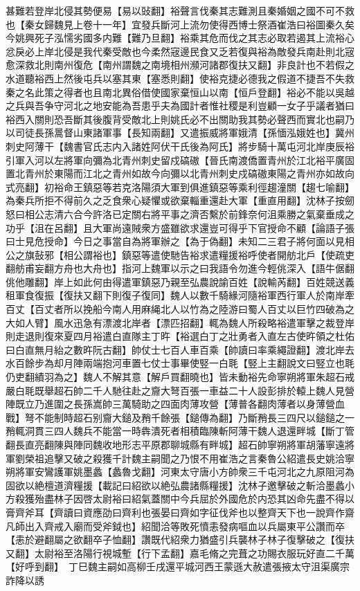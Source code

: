 甚難若登岸北侵其勢便易【易以䜴翻】裕聲言伐秦其志難測且秦婚姻之國不可不救也【秦女歸魏見上卷十一年】宜發兵斷河上流勿使得西博士祭酒崔浩曰裕圖秦久矣今姚興死子泓懦劣國多内難【難乃旦翻】裕乘其危而伐之其志必取若遏其上流裕心忿戾必上岸北侵是我代秦受敵也今柔然宼邊民食又乏若復與裕為敵發兵南赴則北宼愈深救北則南州復危【南州謂魏之南境相州瀕河諸郡復扶又翻】非良計也不若假之水道聽裕西上然後屯兵以塞其東【塞悉則翻】使裕克捷必德我之假道不捷吾不失救秦之名此策之得者也且南北異俗借使國家棄恒山以南【恒戶登翻】裕必不能以吳越之兵與吾争守河北之地安能為吾患乎夫為國計者惟社稷是利豈顧一女子乎議者猶曰裕西入關則恐吾斷其後腹背受敵北上則姚氏必不出關助我其勢必聲西而實北也嗣乃以司徒長孫暠督山東諸軍事【長知兩翻】又遣振威將軍娥清【孫愐泓娥姓也】冀州刺史阿薄干【魏書官氏志内入諸姓阿伏干氏後為阿氏】將步騎十萬屯河北岸庚辰裕引軍入河以左將軍向彌為北青州刺史留戍碻磝【晉氏南渡僑置青州於江北裕平廣固置北青州於東陽而江北之青州如故今向彌以北青州刺史戍碻磝東陽之青州亦如故向式亮翻】初裕命王鎮惡等若克洛陽須大軍到俱進鎮惡等乘利徑趨潼關【趨七喻翻】為秦兵所拒不得前久之乏食衆心疑懼或欲棄輜重還赴大軍【重直用翻】沈林子按劒怒曰相公志清六合今許洛已定關右將平事之濟否繫於前鋒奈何沮乘勝之氣棄垂成之功乎【沮在呂翻】且大軍尚遠賊衆方盛雖欲求還豈可得乎下官授命不顧【論語子張曰士見危授命】今日之事當自為將軍辦之【為于偽翻】未知二三君子將何面以見相公之旗鼔邪【相公謂裕也】鎮惡等遣使馳告裕求遣糧援裕呼使者開舫北戶【使疏吏翻舫甫妄翻方舟也大舟也】指河上魏軍以示之曰我語令勿進今輕佻深入【語牛倨翻佻他雕翻】岸上如此何由得遣軍鎮惡乃親至弘農說諭百姓【說輸芮翻】百姓競送義租軍食復振【復扶又翻下則復子復同】魏人以數千騎緣河隨裕軍西行軍人於南岸牽百丈【百丈者所以挽船今南人用麻䋲北人以竹為之陸游曰蜀人百丈以巨竹四破為之大如人臂】風水迅急有漂渡北岸者【漂匹招翻】輒為魏人所殺略裕遣軍擊之裁登岸則走退則復來夏四月裕遣白直隊主丁旿【裕選白丁之壯勇者入直左古使旿領之杜佑曰白直無月紿之數旿阮古翻】帥仗士七百人車百乘【帥讀曰率乘繩證翻】渡北岸去水百餘步為却月陣兩端抱河車置七仗士事畢使竪一白毦【竪上主翻說文曰竪立也毦仍吏翻績羽為之】魏人不解其意【解戶買翻曉也】皆未動裕先命寧朔將軍朱超石戒嚴白毦既舉超石帥二千人馳往赴之齎大弩百張一車益二十人設彭排於轅上魏人見營陣既立乃進圍之長孫嵩帥三萬騎助之四面肉薄攻營【薄普各翻肉薄者以身薄營血戰】弩不能制時超石别齎大鎚及矟千餘張【鎚傳為翻】乃斷矟長三四尺以鎚鎚之一矟輒洞貫三四人魏兵不能當一時犇潰死者相積臨陳斬阿薄干魏人退還畔城【斷丁管翻長直亮翻陳與陣同魏收地形志平原郡聊城縣有畔城】超石帥寧朔將軍胡藩寧遠將軍劉榮祖追擊又破之殺獲千計魏主嗣聞之乃恨不用崔浩之言秦魯公紹遣長史姚洽寧朔將軍安鸞護軍姚墨蠡【蠡魯戈翻】河東太守唐小方帥衆三千屯河北之九原阻河為固欲以絶檀道濟糧援【載記曰紹欲以絶弘農諸縣糧援】沈林子邀擊破之斬洽墨蠡小方殺獲殆盡林子因啓太尉裕曰紹氣蓋關中今兵屈於外國危於内恐其凶命先盡不得以膏齊斧耳【齊讀曰資應劭曰齊利也張晏曰齊如字征伐斧也以整齊天下也一說齊作齋凡師出入齊戒入廟而受斧鉞也】紹聞洽等敗死憤恚發病嘔血以兵屬東平公讚而卒【恚於避翻屬之欲翻卒子恤翻】讚既代紹衆力猶盛引兵襲林子林子復擊破之【復扶又翻】太尉裕至洛陽行視城塹【行下孟翻】嘉毛脩之完葺之功賜衣服玩好直二千萬【好呼到翻】　丁巳魏主嗣如高柳壬戌還平城河西王蒙遜大赦遣張掖太守沮渠廣宗詐降以誘

